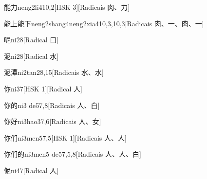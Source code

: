 \begin{entry}{能力}{neng2li4}{10,2}[HSK 3][Radicais ⾁、⼒]
\end{entry}

\begin{entry}{能上能下}{neng2shang4neng2xia4}{10,3,10,3}[Radicais ⾁、⼀、⾁、⼀]
\end{entry}

\begin{entry}{呢}{ni2}{8}[Radical ⼝]
\end{entry}

\begin{entry}{泥}{ni2}{8}[Radical ⽔]
\end{entry}

\begin{entry}{泥潭}{ni2tan2}{8,15}[Radicais ⽔、⽔]
\end{entry}

\begin{entry}{你}{ni3}{7}[HSK 1][Radical ⼈]
\end{entry}

\begin{entry}{你的}{ni3 de5}{7,8}[Radicais ⼈、⽩]
\end{entry}

\begin{entry}{你好}{ni3hao3}{7,6}[Radicais ⼈、⼥]
\end{entry}

\begin{entry}{你们}{ni3men5}{7,5}[HSK 1][Radicais ⼈、⼈]
\end{entry}

\begin{entry}{你们的}{ni3men5 de5}{7,5,8}[Radicais ⼈、⼈、⽩]
\end{entry}

\begin{entry}{伲}{ni4}{7}[Radical ⼈]
\end{entry}

